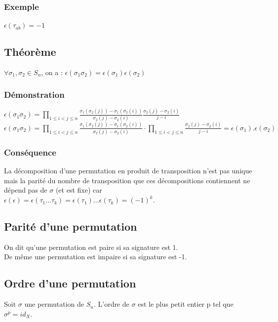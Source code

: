 \documentclass[a4paper,10pt]{book} %
\newcommand{\displayAmath}{\displaystyle}
\begin{document}
\subsubsection{Exemple}
$\epsilon(\tau_{ab})=-1$

\subsection{Théorème}
$\forall \sigma_1,\sigma_2\in S_n$, on a :
$\epsilon(\sigma_1\sigma_2)=\epsilon(\sigma_1)\epsilon(\sigma_2)$

\subsubsection{Démonstration}
$\displayAmath\epsilon(\sigma_1\sigma_2)=\prod_{1\leq i < j \leq n}\frac{\sigma_1(\sigma_2(j))-\sigma_1(\sigma_2(i))}{\sigma_2(j)-\sigma_2(i)}\frac{\sigma_2(j)-\sigma_2(i)}{j-i}$\\

$\displayAmath\epsilon(\sigma_1\sigma_2)=\prod_{1\leq i < j \leq n}\frac{\sigma_1(\sigma_2(j))-\sigma_1(\sigma_2(i))}{\sigma_2(j)-\sigma_2(i)}\cdot\prod_{1\leq i < j \leq n}\frac{\sigma_2(j)-\sigma_2(i)}{j-i}= \epsilon(\sigma_1) . \epsilon(\sigma_2)$

\subsubsection{Conséquence}
La décomposition d'une permutation en produit de transposition n'est pas unique mais la parité du nombre de transposition que ces décompositions contiennent ne dépend pas de $\sigma$ (et est fixe) car $\epsilon(\epsilon)=\epsilon(\tau_1...\tau_k)=\epsilon(\tau_1)...\epsilon(\tau_k)=(-1)^k$.

\subsection{Parité d'une permutation}
On dit qu'une permutation est paire si sa signature est 1.\\

De même une permutation est impaire si sa signature est -1.

\subsection{Ordre d'une permutation}
Soit $\sigma$ une permutation de $S_n$. L'ordre de $\sigma$ est le plus petit entier p tel que $\sigma^p =id_X$.\\
\end{document}
